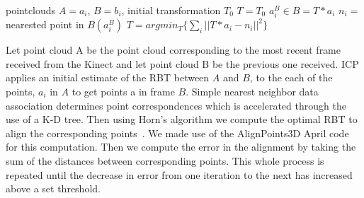 \documentclass[letterpaper, 10pt, conference]{ieeeconf}
\begin{document}

\begin{algorithm}
\begin{algorithmic}
\REQUIRE pointclouds $A = a_{i}$, $B = b_{i} $, initial transformation $T_{0}$
\STATE $T = T_{0}$
\STATE $a^{B}_{i} \in B = T * a_i$
\STATE $n_{i} =$ nearested point in $B(a^{B}_{i})$
\ENDFOR
\STATE $T = argmin_{T} \{\sum_{i} ||T * a_{i} - n_{i} ||^2\}$
\ENDWHILE
\end{algorithmic}
\end{algorithm}


	Let point cloud A be the point cloud corresponding to the most recent frame received from the Kinect and let point cloud B be the previous one received.  ICP applies an initial estimate of the RBT between $A$ and $B$, to the each of the points, $a_{i}$ in $A$ to get points a in frame $B$.  Simple nearest neighbor data association determines point correspondences which is accelerated through the use of a K-D tree.  Then using Horn's algorithm we compute the optimal RBT to align the corresponding points~\cite{horn1987closed}.  We made use of the AlignPoints3D April code for this computation.  Then we compute the error in the alignment by taking the sum of the distances between corresponding points.  This whole process is repeated until the decrease in error from one iteration to the next has increased above a set threshold.
\end{document}
